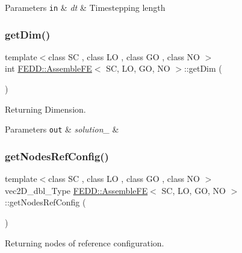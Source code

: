 \begin{DoxyParams}[1]{Parameters}
\mbox{\tt in}  & {\em dt} & Timestepping length \\
\hline
\end{DoxyParams}
\mbox{\label{classFEDD_1_1AssembleFE_a35ada89164c74b433340733c01f30f4b}} 
\subsubsection{\texorpdfstring{get\+Dim()}{getDim()}}
{\footnotesize\ttfamily template$<$class SC , class LO , class GO , class NO $>$ \\
int \hyperlink{classFEDD_1_1AssembleFE}{F\+E\+D\+D\+::\+Assemble\+FE}$<$ SC, LO, GO, NO $>$\+::get\+Dim (\begin{DoxyParamCaption}{ }\end{DoxyParamCaption})}



Returning Dimension. 


\begin{DoxyParams}[1]{Parameters}
\mbox{\tt out}  & {\em solution\+\_\+} & \\
\hline
\end{DoxyParams}
\mbox{\label{classFEDD_1_1AssembleFE_a93f37b5e5f8f9a73152abb2e8be4ba4f}} 
\subsubsection{\texorpdfstring{get\+Nodes\+Ref\+Config()}{getNodesRefConfig()}}
{\footnotesize\ttfamily template$<$class SC , class LO , class GO , class NO $>$ \\
vec2\+D\+\_\+dbl\+\_\+\+Type \hyperlink{classFEDD_1_1AssembleFE}{F\+E\+D\+D\+::\+Assemble\+FE}$<$ SC, LO, GO, NO $>$\+::get\+Nodes\+Ref\+Config (\begin{DoxyParamCaption}{ }\end{DoxyParamCaption})}



Returning nodes of reference configuration. 


